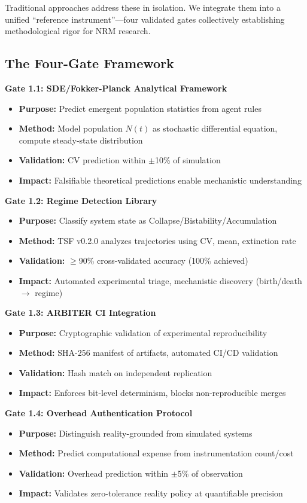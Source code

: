 \documentclass[11pt]{article}
\begin{document}
Traditional approaches address these in isolation. We integrate them into a unified ``reference instrument''—four validated gates collectively establishing methodological rigor for NRM research.

\subsection{The Four-Gate Framework}

\textbf{Gate 1.1: SDE/Fokker-Planck Analytical Framework}
\begin{itemize}
\item \textbf{Purpose:} Predict emergent population statistics from agent rules
\item \textbf{Method:} Model population $N(t)$ as stochastic differential equation, compute steady-state distribution
\item \textbf{Validation:} CV prediction within $\pm$10\% of simulation
\item \textbf{Impact:} Falsifiable theoretical predictions enable mechanistic understanding
\end{itemize}

\textbf{Gate 1.2: Regime Detection Library}
\begin{itemize}
\item \textbf{Purpose:} Classify system state as Collapse/Bistability/Accumulation
\item \textbf{Method:} TSF v0.2.0 analyzes trajectories using CV, mean, extinction rate
\item \textbf{Validation:} $\geq$90\% cross-validated accuracy (100\% achieved)
\item \textbf{Impact:} Automated experimental triage, mechanistic discovery (birth/death $\to$ regime)
\end{itemize}

\textbf{Gate 1.3: ARBITER CI Integration}
\begin{itemize}
\item \textbf{Purpose:} Cryptographic validation of experimental reproducibility
\item \textbf{Method:} SHA-256 manifest of artifacts, automated CI/CD validation
\item \textbf{Validation:} Hash match on independent replication
\item \textbf{Impact:} Enforces bit-level determinism, blocks non-reproducible merges
\end{itemize}

\textbf{Gate 1.4: Overhead Authentication Protocol}
\begin{itemize}
\item \textbf{Purpose:} Distinguish reality-grounded from simulated systems
\item \textbf{Method:} Predict computational expense from instrumentation count/cost
\item \textbf{Validation:} Overhead prediction within $\pm$5\% of observation
\item \textbf{Impact:} Validates zero-tolerance reality policy at quantifiable precision
\end{itemize}
\end{document}

